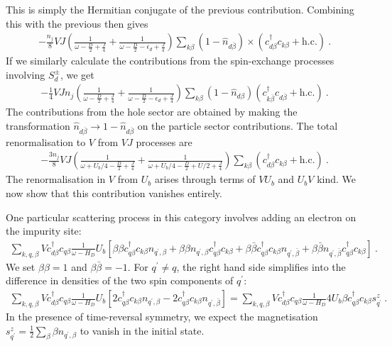 This is simply the Hermitian conjugate of the previous contribution. Combining this with the previous then gives
\begin{eqnarray}
	-\frac{n_j}{8}V J \left(\frac{1}{\omega - \frac{D}{2} + \frac{J}{4}} + \frac{1}{\omega - \frac{D}{2} - \epsilon_d + \frac{J}{4}}\right) \sum_{k\beta}\left(1 - \hat n_{d\overline\beta}\right) \times\left(c^\dagger_{d\beta} c_{k\beta} + \text{h.c.}\right)~.
\end{eqnarray}
If we similarly calculate the contributions from the spin-exchange processes involving \(S_d^\pm\), we get
\begin{eqnarray}
	-\frac{1}{4}V J n_j \left(\frac{1}{\omega - \frac{D}{2} + \frac{J}{4}} + \frac{1}{\omega - \frac{D}{2} - \epsilon_d + \frac{J}{4}}\right) \sum_{k\beta} \left(1 - \hat n_{d\beta}\right)  \left(c^\dagger_{k\overline\beta} c_{d\overline\beta} + \text{h.c.}\right)~.
\end{eqnarray}
The contributions from the hole sector are obtained by making the transformation \(\hat n_{d\overline\beta} \to 1 - \hat n_{d\overline\beta}\) on the particle sector contributions. The total renormalisation to \(V\) from \(VJ\) processes are
\begin{eqnarray}
	-\frac{3n_j}{8}V J \left(\frac{1}{\omega +U_b/4 - \frac{D}{2} + \frac{J}{4}} + \frac{1}{\omega +U_b/4 - \frac{D}{2} + U/2 + \frac{J}{4}}\right)\sum_{k\beta}\left(c^\dagger_{d\beta} c_{k\beta} + \text{h.c.}\right)~.
\end{eqnarray}
The renormalisation in \(V\) from \(U_b\) arises through terms of \(V U_b\) and \(U_b V\) kind. We now show that this contribution vanishes entirely.

One particular scattering process in this category involves adding an electron on the impurity site:
\begin{equation}\begin{aligned}\label{VUb1}
	\sum_{k,q,\beta}Vc^\dagger_{d\beta}c_{q\beta} \frac{1}{\omega - H_D} U_b \left[\beta\beta c^\dagger_{q\beta}c_{k\beta} n_{q^\prime,\beta} + \beta\beta n_{q^\prime,\beta}c^\dagger_{q\beta}c_{k\beta} + \beta\bar\beta c^\dagger_{q\beta}c_{k\beta} n_{q^\prime,\bar\beta} + \beta\bar\beta n_{q^\prime,\bar\beta}c^\dagger_{q\beta}c_{k\beta}\right]~.
\end{aligned}\end{equation}
We set \(\beta \beta = 1 \) and \(\beta \bar\beta=-1\). For \(q^\prime \neq q\), the right hand side simplifies into the difference in densities of the two spin components of \(q^\prime\):
\begin{equation}\begin{aligned}
	\sum_{k,q,\beta}Vc^\dagger_{d\beta}c_{q\beta} \frac{1}{\omega - H_D} U_b \left[2c^\dagger_{q\beta}c_{k\beta} n_{q^\prime,\beta} - 2c^\dagger_{q\beta}c_{k\beta} n_{q^\prime,\bar\beta}\right] = \sum_{k,q,\beta}Vc^\dagger_{d\beta}c_{q\beta} \frac{1}{\omega - H_D} 4U_b \beta c^\dagger_{q\beta}c_{k\beta} s^z_{q^\prime}~.
\end{aligned}\end{equation}
In the presence of time-reversal symmetry, we expect the magnetisation \(s_{q^\prime}^z = \frac{1}{2}\sum_\beta \beta n_{q^\prime,\beta}\) to vanish in the initial state.

